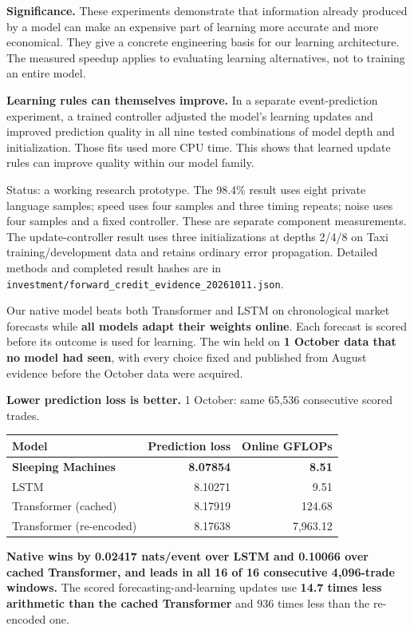 \documentclass[10pt, a4 paper]{article}
\newcommand{\sect}[2]{\vspace{2pt}{\color{ours}\footnotesize\bfseries\MakeUppercase{#1}}\par\vspace{-3pt}{\LARGE\bfseries #2}\par\vspace{2pt}}
\begin{document}
\textbf{Significance.} These experiments demonstrate that information already
produced by a model can make an expensive part of learning more accurate and
more economical. They give a concrete engineering basis for our learning
architecture. The measured speedup applies to evaluating learning alternatives,
not to training an entire model.

\textbf{Learning rules can themselves improve.} In a separate event-prediction
experiment, a trained controller adjusted the model's learning updates and
improved prediction quality in all nine tested combinations of model depth and
initialization. Those fits used more CPU time. This shows that learned update
rules can improve quality within our model family.

{\footnotesize\color{muted}Status: a working research prototype. The 98.4\% result
uses eight private language samples; speed uses four samples and three timing
repeats; noise uses four samples and a fixed controller. These are separate
component measurements. The update-controller result uses three initializations
at depths 2/4/8 on Taxi training/development data and retains ordinary error
propagation. Detailed methods and completed result hashes are in
\texttt{investment/forward\_credit\_evidence\_20261011.json}.}

\newpage
\sect{Online market prediction wins}{Confirmed on a new month, chosen in advance}

Our native model beats both Transformer and LSTM on chronological market
forecasts while \textbf{all models adapt their weights online}. Each forecast is
scored before its outcome is used for learning. The win held on
\textbf{1 October data that no model had seen}, with every choice fixed and
published from August evidence before the October data were acquired.

\begin{tile}
\textbf{Lower prediction loss is better.} 1 October: same 65,536 consecutive scored trades.
\begin{center}
\begin{tabular}{lrr}
\toprule
Model & Prediction loss & Online GFLOPs \\
\midrule
\textbf{Sleeping Machines} & \textbf{8.07854} & \textbf{8.51} \\
LSTM & 8.10271 & 9.51 \\
Transformer (cached) & 8.17919 & 124.68 \\
Transformer (re-encoded) & 8.17638 & 7,963.12 \\
\bottomrule
\end{tabular}
\end{center}
\textbf{Native wins by 0.02417 nats/event over LSTM and 0.10066 over cached Transformer,
and leads in all 16 of 16 consecutive 4,096-trade windows.} The scored
forecasting-and-learning updates use \textbf{14.7 times less arithmetic than the
cached Transformer} and 936 times less than the re-encoded one.
\end{tile}
\end{document}
